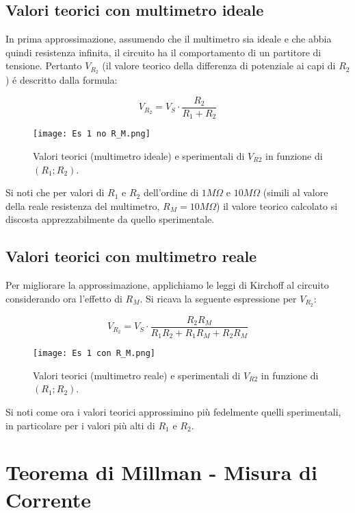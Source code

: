 \documentclass{article}
\begin{document}
		\subsection{Valori teorici con multimetro ideale}
			In prima approssimazione, assumendo che il multimetro sia ideale e che 
			abbia quindi resistenza infinita, il circuito ha il comportamento di un partitore di tensione. 
			Pertanto $V_{R_2}$ 
			(il valore teorico della differenza di potenziale ai capi di $R_2$) 
			é descritto dalla formula:

			\[
				V_{R_2} = V_S \cdot \frac{R_2}{R_1 + R_2}
			\]

			\begin{figure}[h]
				\caption{Valori teorici (multimetro ideale) e sperimentali di $V_{R2}$ in funzione di $(R_1; R_2)$.}
				\centering
				\texttt{[image: Es 1 no R\_M.png]}
			\end{figure}
			
			Si noti che per valori di $R_1$ e $R_2$ dell'ordine di $1M\Omega$ e $10M\Omega$ 
			(simili al valore della reale resistenza del multimetro, $R_M = 10M\Omega$)
			il valore teorico calcolato si discosta apprezzabilmente da quello sperimentale. 
			
		\subsection{Valori teorici con multimetro reale}
			Per migliorare la approssimazione, 
			applichiamo le leggi di Kirchoff al circuito considerando ora l'effetto di $R_M$. 
			Si ricava la seguente espressione per $V_{R_2}$:

			\[
				V_{R_2} = V_S\cdot\frac{R_2R_M}{R_1R_2 + R_1R_M + R_2R_M}
			\]

			\begin{figure}[h]
				\caption{Valori teorici (multimetro reale) e sperimentali di $V_{R2}$ in funzione di $(R_1; R_2)$.}
				\centering
				\texttt{[image: Es 1 con R\_M.png]}
			\end{figure}


			Si noti come ora i valori teorici approssimino più fedelmente quelli sperimentali, 
			in particolare per i valori più alti di $R_1$ e $R_2$.


		

		
	
	\section{Teorema di Millman - Misura di Corrente} \label{sec:Corrente}
\end{document}

